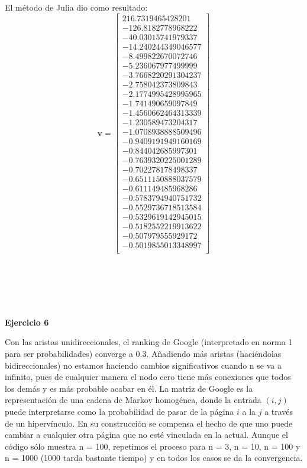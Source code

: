 \documentclass[11pt]{article}
\begin{document}
\begin{multicols}{3}
\noindent
El método de Julia dio como resultado:
$$
 \textbf{v} =
 \begin{bmatrix}
216.7319465428201 \\
-126.8182778968222 \\
-40.03015741979337 \\
-14.240244349046577 \\
-8.499822670072746 \\
-5.236067977499999 \\
-3.7668220291304237 \\
-2.758042373809843 \\
-2.1774995428995965 \\
-1.741490659097849 \\
-1.4560662464313339 \\
-1.230589473204317 \\
-1.0708938888509496 \\
-0.9409191949160169 \\
-0.844042685997301 \\
-0.7639320225001289 \\
-0.702278178498337 \\
-0.6511150888037579 \\
-0.611149485968286 \\
-0.5783794940751732 \\
-0.5529736718513584 \\
-0.5329619142945015 \\
-0.5182552219913622 \\
-0.507979555929172 \\
-0.5019855013348997 \\
\end{bmatrix}
$$

\\
\\
\end{multicols}
\\
\\

\noindent
\textbf{Ejercicio 6}

\noindent
Con las aristas unidireccionales, el ranking de Google (interpretado en norma
1 para ser probabilidades) converge a 0.3.
Añadiendo más aristas (haciéndolas bidireccionales) no estamos haciendo
cambios significativos cuando n se va a infinito, pues de cualquier manera
el nodo cero tiene más conexiones que todos los demás y es más probable
acabar en él.
La matriz de Google es la representación de una cadena de Markov homogénea, donde
la entrada $(i, j)$ puede interpretarse como la probabilidad de pasar de la
página $i$ a la $j$ a través de un hipervínculo. En su construcción se compensa
el hecho de que uno puede cambiar a cualquier otra página que no esté vinculada
en la actual.
Aunque el código sólo muestra n = 100, repetimos el proceso para n = 3, n = 10,
n = 100 y n = 1000 (1000 tarda bastante tiempo) y en todos los casos se da la
convergencia.


\noindent
\end{document}
